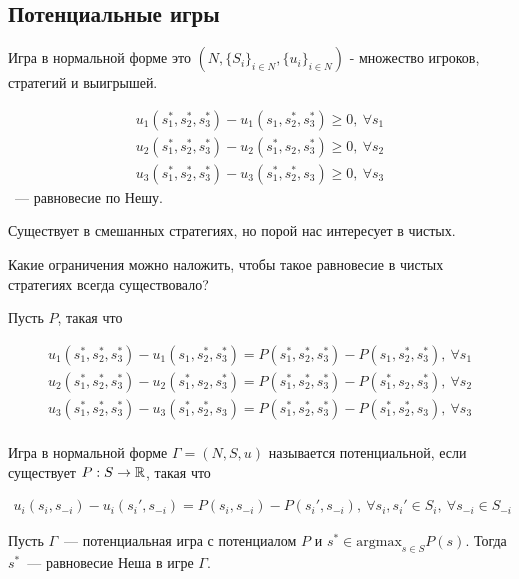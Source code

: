 \documentclass[../main.tex]{subfiles}
\begin{document}
\subsection{Потенциальные игры}

\begin{remrk}
	Игра в нормальной форме это $(N, \{S_i\}_{i \in N}, \{u_i\}_{i \in N})$ - множество игроков, стратегий и выигрышей.

	\begin{align*}
		u_1(s_1^*, s_2^*, s_3^*) - u_1(s_1, s_2^*, s_3^*) \geqslant 0, \ \forall s_1 \\
		u_2(s_1^*, s_2^*, s_3^*) - u_2(s_1^*, s_2, s_3^*) \geqslant 0, \ \forall s_2 \\
		u_3(s_1^*, s_2^*, s_3^*) - u_3(s_1^*, s_2^*, s_3) \geqslant 0, \ \forall s_3
	\end{align*} ~--- равновесие по Нешу.

	Существует в смешанных стратегиях, но порой нас интересует в чистых.

	Какие ограничения можно наложить, чтобы такое равновесие в чистых стратегиях всегда существовало?


\end{remrk}


Пусть $P$, такая что 

\begin{align*}
	u_1(s_1^*, s_2^*, s_3^*) - u_1(s_1, s_2^*, s_3^*) = P(s_1^*, s_2^*, s_3^*) - P(s_1, s_2^*, s_3^*), \ \forall s_1 \\
	u_2(s_1^*, s_2^*, s_3^*) - u_2(s_1^*, s_2, s_3^*) = P(s_1^*, s_2^*, s_3^*) - P(s_1^*, s_2, s_3^*), \ \forall s_2 \\
	u_3(s_1^*, s_2^*, s_3^*) - u_3(s_1^*, s_2^*, s_3) = P(s_1^*, s_2^*, s_3^*) - P(s_1^*, s_2^*, s_3), \ \forall s_3 \\
\end{align*}

\begin{df}
  Игра в нормальной форме $\Gamma = (N, S, u)$ называется потенциальной, если существует $P : S \to \mathbb{R}$, такая что 

	\begin{align*}
		u_i(s_i, s_{-i}) - u_i(s_i', s_{-i}) = P(s_i, s_{-i}) - P(s_i', s_{-i}), \ \forall s_i, s_i' \in S_i, \ \forall s_{-i} \in S_{-i}
	\end{align*}

\end{df}

\begin{claim}
  \label{claim:equlibrim_in_potential_games}
	Пусть $\Gamma$~--- потенциальная игра с потенциалом $P$ и $s^* \in \text{argmax}_{s \in S} P(s)$.
	Тогда  $s^*$~--- равновесие Неша в игре $\Gamma$. 
\end{claim}
\end{document}
